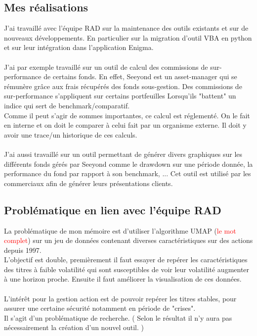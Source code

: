 \subsection*{Mes réalisations}
J'ai travaillé avec l'équipe RAD sur la maintenance des outils existants et sur de nouveaux développements. En particulier sur la migration d'outil VBA en python et sur leur intégration dans l'application Enigma.
\\
\\
J'ai par exemple travaillé sur un outil de calcul des commissions de sur-performance de certains fonds. En effet, Seeyond est un asset-manager qui se rémunère grâce aux frais récupérés des fonds sous-gestion. Des commissions de sur-performance s'appliquent sur certains portfeuilles Lorsqu'ils "battent" un indice qui sert de benchmark/comparatif. 
\\
Comme il peut s'agir de sommes importantes, ce calcul est réglementé. On le fait en interne et on doit le comparer à celui fait par un organisme externe. Il doit y avoir une trace/un historique de ces calculs.
\\
\\
J'ai aussi travaillé sur un outil permettant de générer divers graphiques sur les différents fonds gérés par Seeyond comme le drawdown sur une période donnée, la performance du fond par rapport à son benchmark, ... Cet outil est utilisé par les commerciaux afin de générer leurs présentations clients.

\subsection*{Problématique en lien avec l'équipe RAD}
La problématique de mon mémoire est d'utiliser l'algorithme UMAP (\textcolor{red}{le mot complet}) sur un jeu de données contenant diverses caractéristiques sur des actions depuis 1997.
\\
L'objectif est double, premièrement il faut essayer de repérer les caractéristiques des titres à faible volatilité qui sont susceptibles de voir leur volatilité augmenter à une horizon proche. Ensuite il faut améliorer la visualisation de ces données.
\\
\\
L'intérêt pour la gestion action est de pouvoir repérer les titres stables, pour assurer une certaine sécurité notamment en période de "crises".
\\
Il s'agit d'un problématique de recherche. ( Selon le résultat il n'y aura pas nécessairement la création d'un nouvel outil. ) 